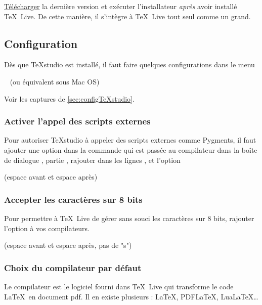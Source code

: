\href{http://www.texstudio.org/}{Télécharger} la dernière version et exécuter l'installateur \emph{après} avoir installé \TeX \ Live. De cette manière, il s'intègre à \TeX \ Live tout seul comme un grand.



\subsection{Configuration}

Dès que TeXstudio est installé, il faut faire quelques configurations dans le menu
\begin{center}
	 \textrightarrow \  \quad (ou équivalent sous Mac OS)
\end{center}
Voir les captures de \ref{sec:configTeXstudio}.


\subsubsection{Activer l'appel des scripts externes}

Pour autoriser TeXstudio à appeler des scripts externes comme Pygments, il faut ajouter une option dans la commande qui est passée au compilateur dans la boîte de dialogue , partie , rajouter dans les lignes ,  et  l'option
\begin{center}
	 \quad (espace avant et espace après)
\end{center}


\subsubsection{Accepter les caractères sur 8 bits}

Pour permettre à \TeX \ Live de gérer sans souci les caractères sur 8 bits, rajouter l'option à vos compilateurs.
\begin{center}
	 \quad (espace avant et espace après, pas de "s")
\end{center} 


\subsubsection{Choix du compilateur par défaut}

Le compilateur est le logiciel fourni dans \TeX \ Live qui transforme le code \LaTeX \ en document pdf. Il en existe plusieurs : \LaTeX, PDF\LaTeX, Lua\LaTeX \dots

